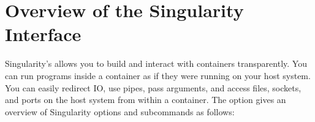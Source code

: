 \documentclass[letterpaper,10pt,english]{sphinxmanual}
\begin{document}
\section{Overview of the Singularity Interface}
\label{\detokenize{quick_start:overview-of-the-singularity-interface}}
Singularity’s {\hyperref[\detokenize{appendix:command-usage}]{}} allows you to build and interact with containers
transparently. You can run programs inside a container as if they were
running on your host system. You can easily redirect IO, use pipes,
pass arguments, and access files, sockets, and ports on the host
system from within a container.
The  option gives an overview of Singularity options and subcommands as
follows:

%
\end{document}
